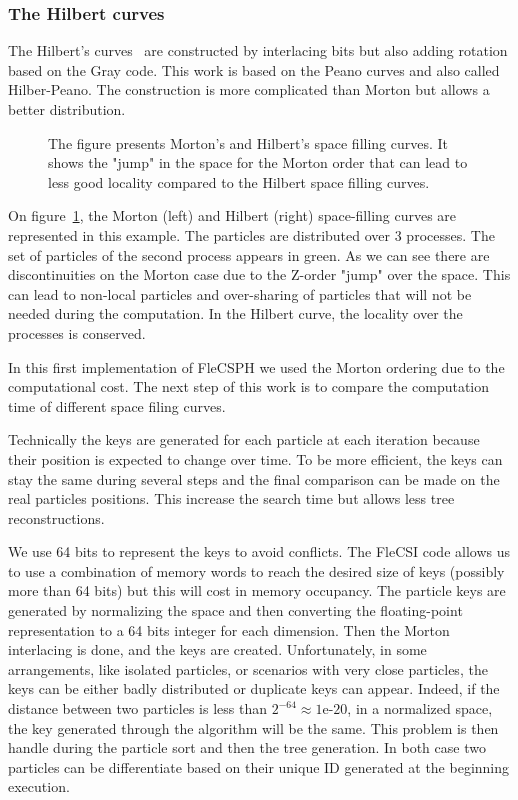 \subsubsection*{The Hilbert curves} The Hilbert's curves~\cite{sagan2012space} are constructed by interlacing bits but also adding rotation based on the Gray code.
This work is based on the Peano curves and also called Hilber-Peano. 
The construction is more complicated than Morton but allows a better distribution. 

\begin{figure}[t!]
\centering

\caption[Morton and Hilbert space filling curves.]{The figure presents Morton's and Hilbert's space filling curves. It shows the "jump" in the space for the Morton order that can lead to less good locality compared to the Hilbert space filling curves.}
\label{fig:space_filling}
\end{figure}

On figure~\ref{fig:space_filling}, the Morton (left) and Hilbert (right) space-filling curves are represented in this example.
The particles are distributed over 3 processes. 
The set of particles of the second process appears in green. 
As we can see there are discontinuities on the Morton case due to the Z-order "jump" over the space. 
This can lead to non-local particles and over-sharing of particles that will not be needed during the computation.
In the Hilbert curve, the locality over the processes is conserved.

In this first implementation of FleCSPH we used the Morton ordering due to the computational cost. 
The next step of this work is to compare the computation time of different space filing curves. 

Technically the keys are generated for each particle at each iteration because their position is expected to change over time. 
To be more efficient, the keys can stay the same during several steps and the final comparison can be made on the real particles positions. 
This increase the search time but allows less tree reconstructions.

We use 64 bits to represent the keys to avoid conflicts.
The FleCSI code allows us to use a combination of memory words to reach the desired size of keys (possibly more than 64 bits) but this will cost in memory occupancy. 
The particle keys are generated by normalizing the space and then converting the floating-point representation to a 64 bits integer for each dimension. 
Then the Morton interlacing is done, and the keys are created. 
Unfortunately, in some arrangements, like isolated particles, or scenarios with very close particles, the keys can be either badly distributed or duplicate keys can appear. 
Indeed, if the distance between two particles is less than $2^{-64} \approx 1$e-$20$, in a normalized space, the key generated through the algorithm will be the same. 
This problem is then handle during the particle sort and then the tree generation. 
In both case two particles can be differentiate based on their unique ID generated at the beginning execution. 


